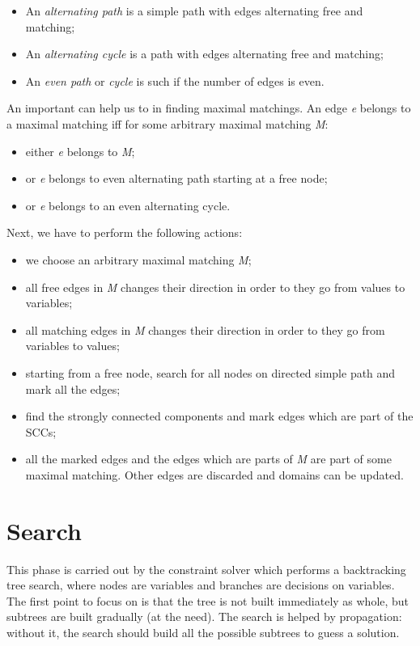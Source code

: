 \documentclass[10pt,a4paper]{article}
\begin{document}
\begin{itemize}
    \item An \textit{alternating path} is a simple path with edges alternating
    free and matching;
    \item An \textit{alternating cycle} is a path with edges alternating free
    and matching;
    \item An \textit{even path} or \textit{cycle} is such if the number of edges
    is even.
\end{itemize}
An important can help us to in finding maximal matchings. An edge \textit{e}
belongs to a maximal matching iff for some arbitrary maximal matching
\textit{M}:

\begin{itemize}
    \item either \textit{e} belongs to \textit{M};
    \item or \textit{e} belongs to even alternating path starting at a free
    node;
    \item or \textit{e} belongs to an even alternating cycle.
\end{itemize}
Next, we have to perform the following actions:

\begin{itemize}
    \item we choose an arbitrary maximal matching \textit{M};
    \item all free edges in \textit{M} changes their direction in order to they
    go from values to variables;
    \item all matching edges in \textit{M} changes their direction in order to
    they go from variables to values;
    \item starting from a free node, search for all nodes on directed simple
    path and mark all the edges;
    \item find the strongly connected components and mark edges which are part
    of the SCCs;
    \item all the marked edges and the edges which are parts of \textit{M} are
    part of some maximal matching. Other edges are discarded and domains can be
    updated.
\end{itemize}

\section{Search}
This phase is carried out by the constraint solver which performs a backtracking
tree search, where nodes are variables and branches are decisions on variables.
The first point to focus on is that the tree is not built immediately as whole,
but subtrees are built gradually (at the need). The search is helped by
propagation: without it, the search should build all the possible subtrees to
guess a solution.
\end{document}
